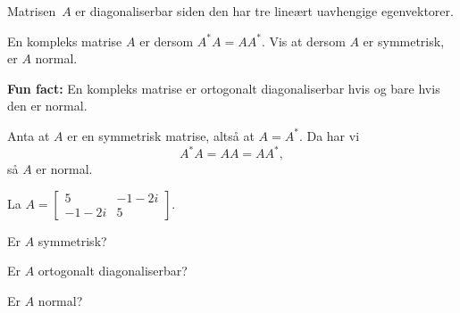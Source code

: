 \begin{losning}
Matrisen~$A$ er diagonaliserbar siden den har tre lineært uavhengige
egenvektorer.
\end{losning}






\begin{oppgave}
En kompleks matrise $A$ er  dersom $A^*A=AA^*$. 
Vis at dersom $A$ er symmetrisk, er $A$ normal. 

\textbf{Fun fact:} En kompleks matrise er ortogonalt diagonaliserbar hvis og bare hvis den er normal.
\end{oppgave}


\begin{losning}
Anta at $A$ er en symmetrisk matrise, altså at $A = A^*$.  Da har vi
\[
A^* A = A A = A A^*,
\]
så $A$ er normal.
\end{losning}


\begin{oppgave}
La 
$
A=
\begin{bmatrix}
5 &-1-2i \\-1-2i & 5
\end{bmatrix}.
$
\begin{punkt}
Er $A$ symmetrisk?
\end{punkt}
\begin{punkt}
Er $A$ ortogonalt diagonaliserbar? 
\end{punkt}
\begin{punkt}
Er $A$ normal?
\end{punkt}
\end{oppgave}


